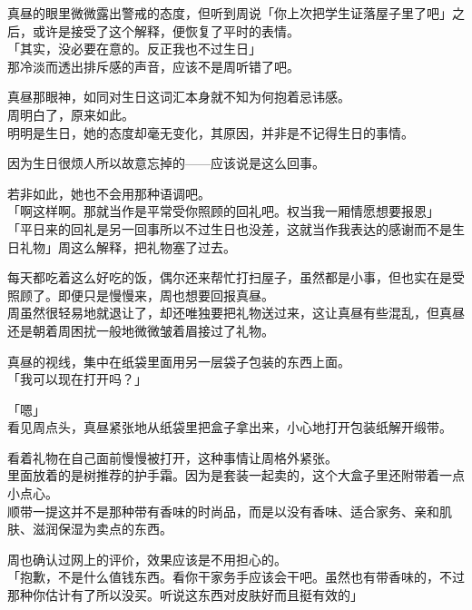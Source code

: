 真昼的眼里微微露出警戒的态度，但听到周说「你上次把学生证落屋子里了吧」之后，或许是接受了这个解释，便恢复了平时的表情。\\

「其实，没必要在意的。反正我也不过生日」\\

那冷淡而透出排斥感的声音，应该不是周听错了吧。

真昼那眼神，如同对生日这词汇本身就不知为何抱着忌讳感。\\

周明白了，原来如此。\\

明明是生日，她的态度却毫无变化，其原因，并非是不记得生日的事情。

因为生日很烦人所以故意忘掉的——应该说是这么回事。

若非如此，她也不会用那种语调吧。\\

「啊这样啊。那就当作是平常受你照顾的回礼吧。权当我一厢情愿想要报恩」\\

「平日来的回礼是另一回事所以不过生日也没差，这就当作我表达的感谢而不是生日礼物」周这么解释，把礼物塞了过去。

每天都吃着这么好吃的饭，偶尔还来帮忙打扫屋子，虽然都是小事，但也实在是受照顾了。即便只是慢慢来，周也想要回报真昼。\\

周虽然很轻易地就退让了，却还唯独要把礼物送过来，这让真昼有些混乱，但真昼还是朝着周困扰一般地微微皱着眉接过了礼物。

真昼的视线，集中在纸袋里面用另一层袋子包装的东西上面。\\

「我可以现在打开吗？」

「嗯」\\

看见周点头，真昼紧张地从纸袋里把盒子拿出来，小心地打开包装纸解开缎带。

看着礼物在自己面前慢慢被打开，这种事情让周格外紧张。\\

里面放着的是树推荐的护手霜。因为是套装一起卖的，这个大盒子里还附带着一点小点心。\\

顺带一提这并不是那种带有香味的时尚品，而是以没有香味、适合家务、亲和肌肤、滋润保湿为卖点的东西。

周也确认过网上的评价，效果应该是不用担心的。\\

「抱歉，不是什么值钱东西。看你干家务手应该会干吧。虽然也有带香味的，不过那种你估计有了所以没买。听说这东西对皮肤好而且挺有效的」

